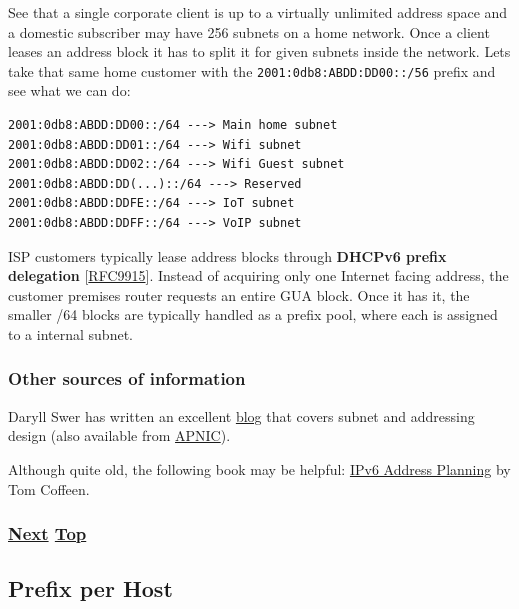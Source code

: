 \documentclass[
]{article}
\begin{document}
See that a single corporate client is up to a virtually unlimited
address space and a domestic subscriber may have 256 subnets on a home
network. Once a client leases an address block it has to split it for
given subnets inside the network. Let\textquotesingle s take that same
home customer with the \texttt{2001:0db8:ABDD:DD00::/56} prefix and see
what we can do:

\begin{verbatim}
2001:0db8:ABDD:DD00::/64 ---> Main home subnet
2001:0db8:ABDD:DD01::/64 ---> Wifi subnet
2001:0db8:ABDD:DD02::/64 ---> Wifi Guest subnet
2001:0db8:ABDD:DD(...)::/64 ---> Reserved
2001:0db8:ABDD:DDFE::/64 ---> IoT subnet
2001:0db8:ABDD:DDFF::/64 ---> VoIP subnet
\end{verbatim}

ISP customers typically lease address blocks through \textbf{DHCPv6
prefix delegation}
{[}\href{https://www.rfc-editor.org/info/rfc9915}{RFC9915}{]}. Instead
of acquiring only one Internet facing address, the customer premises
router requests an entire GUA block. Once it has it, the smaller /64
blocks are typically handled as a prefix pool, where each is assigned to
a internal subnet.

\subsubsection{Other sources of
information}\label{other-sources-of-information}

Daryll Swer has written an excellent
\href{https://www.daryllswer.com/ipv6-architecture-and-subnetting-guide-for-network-engineers-and-operators/}{blog}
that covers subnet and addressing design (also available from
\href{https://blog.apnic.net/2023/04/04/ipv6-architecture-and-subnetting-guide-for-network-engineers-and-operators/}{APNIC}).

Although quite old, the following book may be helpful:
\href{https://www.oreilly.com/library/view/ipv6-address-planning/9781491908211/}{IPv6
Address Planning} by Tom Coffeen.

\subsubsection{\texorpdfstring{\hyperref[prefix-per-host]{Next}
\hyperref[network-design]{Top}}{Next Top}}\label{next-top-4}

\pagebreak

\subsection{Prefix per Host}\label{prefix-per-host}
\end{document}
